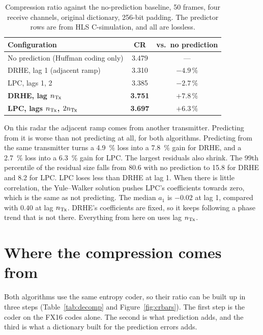 \begin{table}[htbp]
\centering
\caption[The prediction lag]{Compression ratio against the no-prediction
baseline, 50 frames, four receive channels, original dictionary, 256-bit
padding. The predictor rows are from HLS C-simulation, and all are lossless.}
\label{tab:predaxis}
\small
\begin{tabular}{l|c|c}
\textbf{Configuration} & \textbf{CR} & \textbf{vs.\ no prediction}\\
\hline
No prediction (Huffman coding only)            & \num{3.479} & ---\\
DRHE, lag 1 (adjacent ramp)                    & \num{3.310} & $-4.9\,\%$\\
LPC, lags 1, 2                                 & \num{3.385} & $-2.7\,\%$\\
\textbf{DRHE, lag $n_{\mathrm{Tx}}$}                      & \textbf{\num{3.751}} & $\mathbf{+7.8\,\%}$\\
\textbf{LPC, lags $n_{\mathrm{Tx}}$, $2n_{\mathrm{Tx}}$}             & \textbf{\num{3.697}} & $\mathbf{+6.3\,\%}$\\
\end{tabular}
\end{table}

On this radar the adjacent ramp comes from another transmitter. Predicting from
it is worse than not predicting at all, for both algorithms. Predicting from
the same transmitter turns a \SI{4.9}{\percent} loss into a
\SI{7.8}{\percent} gain for DRHE, and a \SI{2.7}{\percent} loss into a
\SI{6.3}{\percent} gain for LPC. The largest residuals also shrink. The 99th
percentile of the residual size falls from \num{80.6} with no prediction to
\num{15.8} for DRHE and \num{8.2} for LPC. LPC loses less than DRHE at lag 1.
When there is little correlation, the Yule--Walker solution pushes LPC's
coefficients towards zero, which is the same as not predicting. The median
$a_1$ is $-0.02$ at lag 1, compared with $0.40$ at lag $n_{\mathrm{Tx}}$. DRHE's
coefficients are fixed, so it keeps following a phase trend that is not there.
Everything from here on uses lag $n_{\mathrm{Tx}}$.

\section{Where the compression comes from}
\label{sec:decomp}

Both algorithms use the same entropy coder, so their ratio can be built up in
three steps (Table~\ref{tab:decomp} and Figure~\ref{fig:crbars}). The first
step is the coder on the FX16 codes alone. The second is what prediction adds,
and the third is what a dictionary built for the prediction errors adds.

